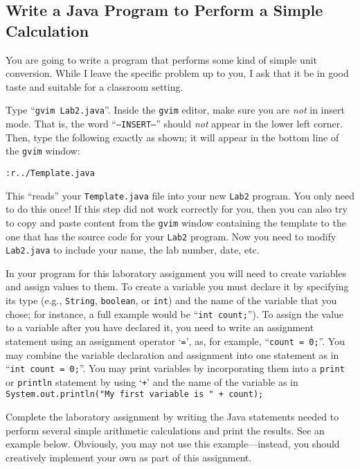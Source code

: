 \vspace*{-.1in}
\subsection*{Write a Java Program to Perform a Simple Calculation}

You are going to write a program that performs some kind of simple unit conversion. While I leave the specific problem
up to you, I ask that it be in good taste and suitable for a classroom setting.

 Type ``{\tt gvim Lab2.java}''. Inside the {\tt gvim} editor, make sure you are {\em
not} in insert mode. That is, the word ``{\tt --INSERT--}'' should {\em not} appear in the lower left corner. Then, type
the following exactly as shown; it will appear in the bottom line of the {\tt gvim} window:

\begin{center} \verb$:r../Template.java$ \end{center}

This ``reads'' your {\tt Template.java} file into your new {\tt Lab2} program.  You only need to do this once!  If this
step did not work correctly for you, then you can also try to copy and paste content from the {\tt gvim} window
containing the template to the one that has the source code for your {\tt Lab2} program. Now you need to modify {\tt
Lab2.java} to include your name, the lab number, date, etc.

In your program for this laboratory assignment you will need to create variables and assign values to them. To create a
variable you must declare it by specifying its type (e.g., {\tt String}, {\tt boolean}, or {\tt int}) and the name of
the variable that you chose; for instance, a full example would be ``{\tt int count;}'').  To assign the value to a
variable after you have declared it, you need to write an assignment statement using an assignment operator `{\tt =}',
as, for example, ``{\tt count = 0;}''. You may combine the variable declaration and assignment into one statement as in
``{\tt int count = 0;}''. You may print variables by incorporating them into a {\tt print} or {\tt println} statement by
using `{\tt +}' and the name of the variable as in {\tt System.out.println("My first variable is " + count);}

 Complete the laboratory assignment by writing the Java statements needed to perform several simple arithmetic
 calculations and print the results. See an example below. Obviously, you may not use this example---instead, you should
 creatively implement your own as part of this assignment.

